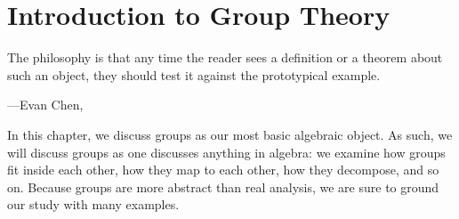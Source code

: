 \documentclass[../notes.tex]{subfiles}
\begin{document}
\chapter{Introduction to Group Theory} \label{ch:grp}
\epigraph{The philosophy is that any time the reader sees a definition or a theorem about such an object, they should test it against the prototypical example.}
{---Evan Chen, \cite{napkin}}
In this chapter, we discuss groups as our most basic algebraic object. As such, we will discuss groups as one discusses anything in algebra: we examine how groups fit inside each other, how they map to each other, how they decompose, and so on. Because groups are more abstract than real analysis, we are sure to ground our study with many examples.

% 



\end{document}
